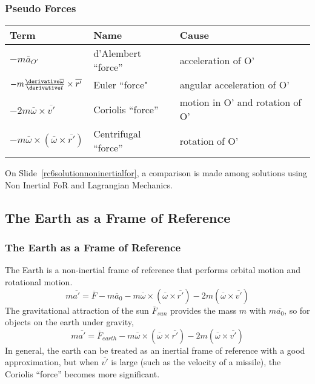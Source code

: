 \begin{frame}\label{rc4psdeudoforces}
\frametitle{Pseudo Forces}
\begin{tabular}{lll}
\hline
Term&Name&Cause\\\hline
$-m\overline{a}_{O'}$&d'Alembert ``force''&acceleration of O'\\
$-m\frac{\derivative\overline{\omega}}{\derivative t}\times \overline{r'}$&Euler ``force"&angular acceleration of O'\\
$-2m\overline{\omega}\times\overline{v'}$&Coriolis ``force''&motion in O' and rotation of O'\\
$-m\overline{\omega}\times(\overline{\omega}\times\overline{r'})$&Centrifugal ``force''&rotation of O'\\\hline
\end{tabular}
On Slide~\ref{rc6solutionnoninertialfor}, a comparison is made among solutions using Non Inertial FoR and Lagrangian Mechanics.
\end{frame}
\subsection{The Earth as a Frame of Reference}
\begin{frame}
\frametitle{The Earth as a Frame of Reference}
The Earth is a non-inertial frame of reference that performs orbital motion and rotational motion.
\[m\overline{a'}=\overline{F}-m\overline{a}_0-m\overline{\omega}\times(\overline{\omega}\times\overline{r'})-2m(\overline{\omega}\times\overline{v'})\]
The gravitational attraction of the sun $\overline{F}_{sun}$ provides the mass $m$ with $m\overline{a_0}$, so for objects on the earth under gravity,
\[
m\overline{a'}=\overline{F}_{earth}-m\overline{\omega}\times(\overline{\omega}\times\overline{r'})-2m(\overline{\omega}\times\overline{v'})
\]
In general, the earth can be treated as an inertial frame of reference with a good approximation, but when $\overline{v'}$ is large (such as the velocity of a missile), the Coriolis ``force'' becomes more significant.
\end{frame}
